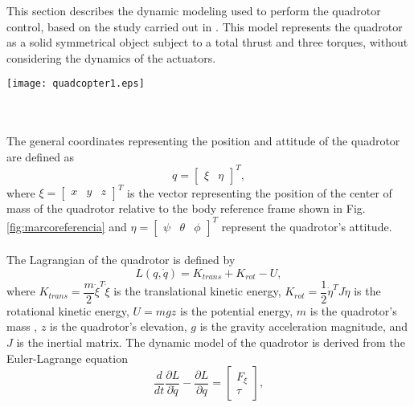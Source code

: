 This section describes the dynamic modeling used to perform the quadrotor control, based on the study carried out in \cite{modelamiento, modelamientoPDAFC, modelamientoNCQ}. This model represents the quadrotor as a solid symmetrical object subject to a total thrust and three torques, without considering the dynamics of the actuators.
\begin{figure*}
\begin{center}
  \texttt{[image: quadcopter1.eps]}
\caption{Quadrotor squeme with movement axis and thrust forces.} 
    \label{fig:marcoreferencia}
    \end{center}
\end{figure*}
\\\\The general coordinates representing the position and attitude of the quadrotor are defined as
\begin{equation}
	q=\begin{bmatrix}
	\xi & \eta
	\end{bmatrix}^{T},
	\label{ec:coorgenerales}
\end{equation}
where $\xi=\begin{bmatrix}
x & y & z
\end{bmatrix}^{T}$ is the vector representing the position of the center of mass of the quadrotor relative to the body reference frame shown in Fig. \ref{fig:marcoreferencia} and $\eta=\begin{bmatrix}
\psi & \theta & \phi
\end{bmatrix}^{T}$ represent the quadrotor's attitude.
\\\\
The Lagrangian of the quadrotor is defined by
\begin{equation}
	L(q,\dot{q})=K_{trans}+K_{rot} - U,	
	\label{ec:lagrangiano}
\end{equation}
where $ K_{trans} = \dfrac{m}{2}\dot{\xi}^{T}\dot{\xi} $ is the translational kinetic energy, $ K_{rot} = \dfrac{1}{2}\dot{\eta}^{T}J\dot{\eta} $ is the rotational kinetic energy, $ U=mgz $ is the potential energy, $m$ is the quadrotor's mass , $z$ is the quadrotor's elevation, $g$ is the gravity acceleration magnitude, and $J$ is the inertial matrix. The dynamic model of the quadrotor is derived from the Euler-Lagrange equation
\begin{equation}
	\dfrac{d}{dt}\dfrac{\partial L}{\partial \dot{q}}-\dfrac{\partial L}{\partial q}=
	\begin{bmatrix}
	F_{\xi}\\
	\tau
	\end{bmatrix},
	\label{ec:eulerlag}
 \end{equation} 
